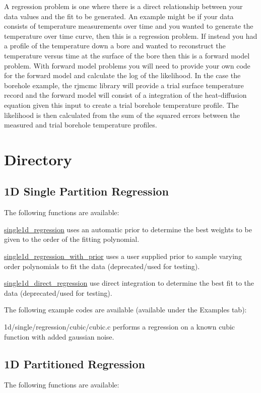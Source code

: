 A regression problem is one where there is a direct relationship between your data values and the fit to be generated. An example might be if your data consists of temperature measurements over time and you wanted to generate the temperature over time curve, then this is a regression problem. If instead you had a profile of the temperature down a bore and wanted to reconstruct the temperature versus time at the surface of the bore then this is a forward model problem. With forward model problems you will need to provide your own code for the forward model and calculate the log of the likelihood. In the case the borehole example, the rjmcmc library will provide a trial surface temperature record and the forward model will consist of a integration of the heat-\/diffusion equation given this input to create a trial borehole temperature profile. The likelihood is then calculated from the sum of the squared errors between the measured and trial borehole temperature profiles.\hypertarget{index_Directory}{}\section{Directory}\label{index_Directory}
\hypertarget{index_singleregress1d}{}\subsection{1\+D Single Partition Regression}\label{index_singleregress1d}
The following functions are available\+:


\begin{DoxyItemize}
\item \hyperlink{regression_8h_a037d789bc3de5c4c55b0c781193ae3b7}{single1d\+\_\+regression} uses an automatic prior to determine the best weights to be given to the order of the fitting polynomial.
\item \hyperlink{regression_8h_ac8c2d9357e8a0ac1ff03fc48843e804b}{single1d\+\_\+regression\+\_\+with\+\_\+prior} uses a user supplied prior to sample varying order polynomials to fit the data (deprecated/used for testing).
\item \hyperlink{regression_8h_a0ab9525ab0dc478cfa18bc9bd5a94d97}{single1d\+\_\+direct\+\_\+regression} use direct integration to determine the best fit to the data (deprecated/used for testing).
\end{DoxyItemize}

The following example codes are available (available under the Examples tab)\+:


\begin{DoxyItemize}
\item 1d/single/regression/cubic/cubic.\+c performs a regression on a known cubic function with added gaussian noise.
\end{DoxyItemize}\hypertarget{index_partregress1d}{}\subsection{1\+D Partitioned Regression}\label{index_partregress1d}
The following functions are available\+:



